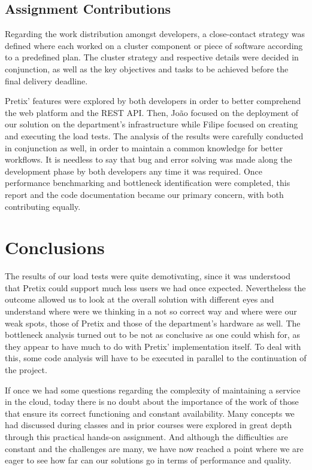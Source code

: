 \documentclass[12pt]{article}
\begin{document}
\subsection{Assignment Contributions} \label{remarks.contributions} %


Regarding the work distribution amongst developers, a close-contact strategy was defined where each worked on a cluster component or piece of software according 
to a predefined plan. 
The cluster strategy and respective details were decided in conjunction, as well as the key objectives and tasks to be achieved before the final delivery deadline.

Pretix' features were explored by both developers in order to better comprehend the web platform and the REST API.
Then, João focused on the deployment of our solution on the department's infrastructure while Filipe focused on creating and executing the load tests.
The analysis of the results were carefully conducted in conjunction as well, in order to maintain a common knowledge for better workflows.
It is needless to say that bug and error solving was made along the development phase by both developers any time it was required.
Once performance benchmarking and bottleneck identification were completed, this report and the code documentation became our primary concern, with both 
contributing equally.

\newpage
\section*{Conclusions} \label{conclusions} %

The results of our load tests were quite demotivating, since it was understood that Pretix could support much less users we had once expected.
Nevertheless the outcome allowed us to look at the overall solution with different eyes and understand where were we thinking in a not so correct way and where 
were our weak spots, those of Pretix and those of the department's hardware as well.
The bottleneck analysis turned out to be not as conclusive as one could whish for, as they appear to have much to do with Pretix' implementation itself.
To deal with this, some code analysis will have to be executed in parallel to the continuation of the project.

If once we had some questions regarding the complexity of maintaining a service in the cloud, today there is no doubt about the importance of the work of those 
that ensure its correct functioning and constant availability.
Many concepts we had discussed during classes and in prior courses were explored in great depth through this practical hands-on assignment.
And although the difficulties are constant and the challenges are many, we have now reached a point where we are eager to see how far can our solutions go in 
terms of performance and quality. 
\end{document}
